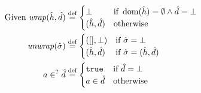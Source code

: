 \begin{align*}
	\text{Given }
	{\operatorname{\mathit{wrap}}}(\hat{h}, \hat{d}) &\stackrel{\textnormal{def}}= \begin{cases}
		\bot &\text{if}~\operatorname{dom}(\hat{h})=\emptyset \land \hat{d}=\bot\\
		(\hat{h},\hat{d})&\text{otherwise}
	\end{cases}\\
	{\operatorname{\mathit{unwrap}}}(\hat{\sigma}) & \stackrel{\textnormal{def}}= \begin{cases}
		([], \bot) &\text{if}~\hat{\sigma}=\bot\\
		(\hat{h}, \hat{d}) &\text{if}~\hat{\sigma}=(\hat{h},\hat{d})
	\end{cases}\\
	a \in^? \hat{d} &\stackrel{\textnormal{def}}= \begin{cases}
		\texttt{true} &\text{if}~\hat{d} =\bot\\
		a\in \hat{d}&\text{otherwise}
	\end{cases}
\end{align*}
